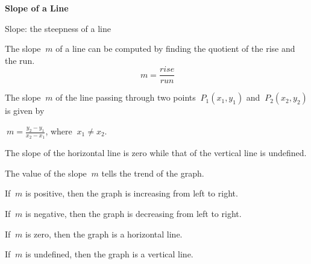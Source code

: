 \begin{center}
\textbf{Slope of a Line 
}
\end{center}

\vspce

Slope: the steepness of a line

The slope $\ {m }$ of a line can be computed by finding the quotient of the rise and the run. \[\ {m=\displaystyle  \frac{rise}{run}}\] 

The slope $\ {m }$  of the line passing through two points $\ { P_1(x_1, y_1)}$   and $\ {P_2(x_2, y_2) }$  is given by
\begin{center}
 $\ {m = \displaystyle  \frac{y_2-y_1}{x_2-x_1}}$, where  $\ {x_1 \neq x_2 }$.
\end{center} 
The slope of the horizontal line is zero while that of the vertical line is undefined. 

The value of the slope $\ {m }$  tells the trend of the graph. 

If $\ {m }$ is positive, then the graph is increasing from left to right.

If $\ {m }$ is negative, then the graph is decreasing from left to right.

If $\ {m }$ is zero, then the graph is a horizontal  line.

If $\ {m }$ is undefined, then the graph is a vertical line.



